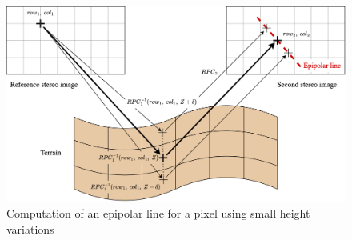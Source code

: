\begin{figure}
    \centering
    \includegraphics[width=\linewidth]{Images/Chap_1/epipolar_lines.png}
    \caption{Computation of an epipolar line for a pixel using small height variations}
    \label{fig:epipolar_lines}
\end{figure}

